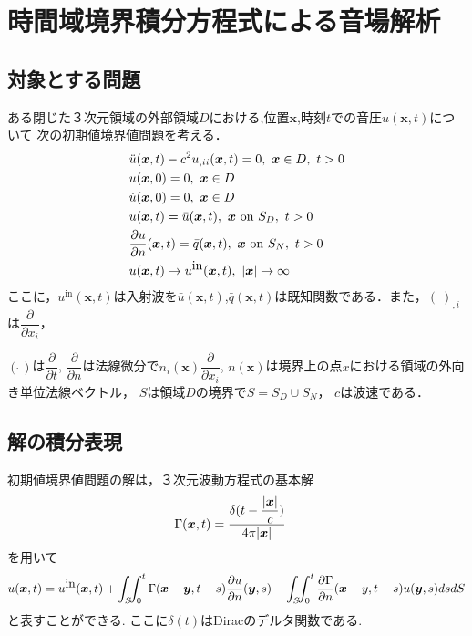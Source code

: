\documentclass[dvipdfmx]{ampbt}
\def\vector#1{\mbox{\boldmath $#1$}}
\begin{document}
\section{時間域境界積分方程式による音場解析}
\label{2章}
\subsection{対象とする問題}
\label{q}
ある閉じた３次元領域の外部領域$D$における,位置$\bm{x}$,時刻$t$での音圧$u(\bm{x},t)$について
次の初期値境界値問題を考える．
\begin{align}
&\ddot{u}(\bm{x},t)-c^2 u_{,ii}(\bm{x},t)=0,\  \bm{x} \in D,\ t>0 \\
&u(\bm{x},0)=0,\  \vector{x} \in D \\
&\dot{u}(\bm{x},0)=0,\  \vector{x} \in D \\
\label{eq:u_y}
&u(\vector{x},t)=\bar{u}(\bm{x},t),\  \vector{x}\  \mbox{on} \ S_D,\ t>0 \\
\label{eq:q_y}
&\frac{\partial{u}}{\partial{n}} (\bm{x},t)=\bar{q}(\bm{x},t),\  \bm{x}\  \mbox{on} \ S_N,\ t>0 \\
&u(\bm{x},t) \to u^{\mbox{in}}(\bm{x},t),\ |\vector{x}| \to \infty
\end{align}
ここに，$u^{\mbox{in}}(\bm{x},t)$は入射波を$\bar{u}(\bm{x},t)$,$\bar{q}(\bm{x},t)$は既知関数である．また，$(\ )_{,i}$は$\dfrac{\partial{}}{\partial{x_i}}$，

$(\dot{\ })$は$\dfrac{\partial{}}{\partial{t}}$,
$\dfrac{\partial{}}{\partial{n}}$は法線微分で$n_i(\bm{x}) \dfrac{\partial{}}{\partial{x_i}}$,
$n(\bm{x})$は境界上の点$x$における領域の外向き単位法線ベクトル，
$S$は領域$D$の境界で$S=S_D \cup S_N$，
$c$は波速である．

\subsection{解の積分表現}
初期値境界値問題の解は，３次元波動方程式の基本解
\begin{align}
&\Gamma(\bm{x},t) = \displaystyle \frac{\delta(t-\dfrac{|\vector{x}|}{c})}{4\pi|\vector{x}|}
\end{align}
を用いて
\begin{equation}
  \label{eq:境界積分方程式}
u(\bm{x},t) = u^{\mbox{in}}(\vector{x},t) + \int_S\!\!\int_0^t \Gamma(\bm{x}-\vector{y},t-s) \frac{\partial u}{\partial n}(\vector{y},s) - \int_S\!\!\int_0^t \frac{\partial \Gamma}{\partial n}(\bm{x}-y,t-s) u(\vector{y},s) ds dS
\end{equation}
と表すことができる.
ここに$\delta(t)$はDiracのデルタ関数である.
\end{document}
